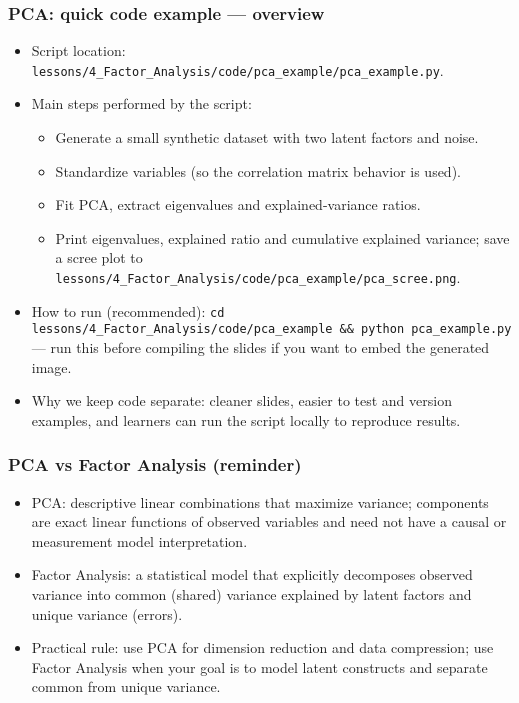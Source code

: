 \documentclass[aspectratio=169]{beamer}
\begin{document}
\begin{frame}
\frametitle{PCA: quick code example — overview}
\begin{itemize}
    	\item Script location: \texttt{lessons/4\_Factor\_Analysis/code/pca\_example/pca\_example.py}. \pause
    \item Main steps performed by the script: \pause
    \begin{itemize}
        \item Generate a small synthetic dataset with two latent factors and noise. \pause
        \item Standardize variables (so the correlation matrix behavior is used). \pause
        \item Fit PCA, extract eigenvalues and explained-variance ratios. \pause
    \item Print eigenvalues, explained ratio and cumulative explained variance; save a scree plot to \texttt{lessons/4\_Factor\_Analysis/code/pca\_example/pca\_scree.png}. \pause
    \end{itemize}
    	\item How to run (recommended): \texttt{cd lessons/4\_Factor\_Analysis/code/pca\_example \&\& python pca\_example.py} — run this before compiling the slides if you want to embed the generated image. \pause
    \item Why we keep code separate: cleaner slides, easier to test and version examples, and learners can run the script locally to reproduce results.\pause
\end{itemize}
\vspace{6pt}
\end{frame}

\begin{frame}
\frametitle{PCA vs Factor Analysis (reminder)}
\begin{itemize}
    \item PCA: descriptive linear combinations that maximize variance; components are exact linear functions of observed variables and need not have a causal or measurement model interpretation. \pause
    \item Factor Analysis: a statistical model that explicitly decomposes observed variance into common (shared) variance explained by latent factors and unique variance (errors). \pause
    \item Practical rule: use PCA for dimension reduction and data compression; use Factor Analysis when your goal is to model latent constructs and separate common from unique variance. \pause
\end{itemize}
\end{frame}
\end{document}
